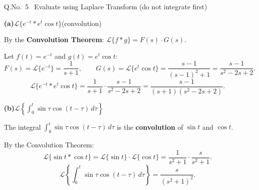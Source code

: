 \documentclass[12pt]{article}
\newcommand{\Lt}{\mathcal{L}}
\begin{document}
\vspace{12pt}

\begin{qbox}{Q.No.\ 5 \textemdash\ Evaluate using Laplace Transform (do not integrate first)}
\end{qbox}

\medskip\textbf{(a)}\quad $\Lt\{e^{-t}*e^{t}\cos t\}$\quad (convolution)

\begin{ansbox}
By the \textbf{Convolution Theorem}: $\Lt\{f*g\}=F(s)\cdot G(s)$.

Let $f(t)=e^{-t}$ and $g(t)=e^t\cos t$:
\[
  F(s)=\Lt\{e^{-t}\}=\frac{1}{s+1},\qquad G(s)=\Lt\{e^t\cos t\}=\frac{s-1}{(s-1)^2+1}=\frac{s-1}{s^2-2s+2}.
\]
\[
  \boxed{\Lt\{e^{-t}*e^t\cos t\}=\frac{1}{s+1}\cdot\frac{s-1}{s^2-2s+2}=\frac{s-1}{(s+1)(s^2-2s+2)}.}
\]
\end{ansbox}

\medskip\textbf{(b)}\quad $\Lt\!\left\{\displaystyle\int_0^t\sin\tau\cos(t-\tau)\,d\tau\right\}$

\begin{ansbox}
The integral $\displaystyle\int_0^t\sin\tau\cos(t-\tau)\,d\tau$ is the \textbf{convolution} of $\sin t$ and $\cos t$.

By the Convolution Theorem:
\[
  \Lt\{\sin t*\cos t\}=\Lt\{\sin t\}\cdot\Lt\{\cos t\}=\frac{1}{s^2+1}\cdot\frac{s}{s^2+1}.
\]
\[
  \boxed{\Lt\!\left\{\int_0^t\sin\tau\cos(t-\tau)\,d\tau\right\}=\frac{s}{(s^2+1)^2}.}
\]
\end{ansbox}
\end{document}
